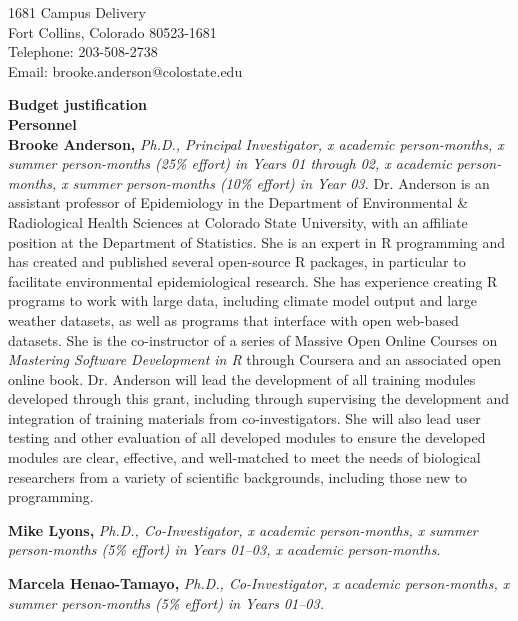 \documentclass[pdftex,english,11pt,parskip=half]{scrartcl}
\begin{document}
1681 Campus Delivery \\
Fort Collins, Colorado 80523-1681 \\
Telephone: 203-508-2738 \\
Email: brooke.anderson@colostate.edu \\

\clearpage


\textbf{Budget justification} \ \\

{\large \textbf{Personnel}} \\

\noindent \textbf{Brooke Anderson,} \textit{Ph.D., Principal Investigator, x academic person-months, x summer person-months (25\% effort) in Years 01 through 02, x academic person-months, x summer person-months (10\% effort) in Year 03.} Dr. Anderson is an assistant professor of Epidemiology in the Department of Environmental \& Radiological Health Sciences at Colorado State University, with an affiliate position at the Department of Statistics. She is an expert in R programming and has created and published several open-source R packages, in particular to facilitate environmental epidemiological research. She has experience creating R programs to work with large data, including climate model output and large weather datasets, as well as programs that interface with open web-based datasets. She is the co-instructor of a series of Massive Open Online Courses on \textit{Mastering Software Development in R} through Coursera and an associated open online book. Dr. Anderson will lead the development of all training modules developed through this grant, including through supervising the development and integration of training materials from co-investigators. She will also lead user testing and other evaluation of all developed modules to ensure the developed modules are clear, effective, and well-matched to meet the needs of biological researchers from a variety of scientific backgrounds, including those new to programming. 

\noindent \textbf{Mike Lyons,} \textit{Ph.D., Co-Investigator, x academic person-months, x summer person-months (5\% effort) in Years 01--03, x academic person-months.}

\noindent \textbf{Marcela Henao-Tamayo,} \textit{Ph.D., Co-Investigator, x academic person-months, x summer person-months (5\% effort) in Years 01--03.}
\end{document}
